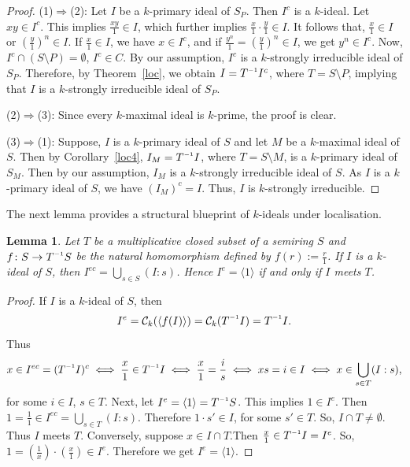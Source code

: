 \documentclass[11pt,english]{amsart}
\newcommand{\inv}{^{\raisebox{.2ex}{$\scriptscriptstyle-1$}}}
\newtheorem{lemma}[theorem]{Lemma}
\theoremstyle{definition}
\numberwithin{equation}{section}
\begin{document}
\begin{proof}
	(1)$\Rightarrow$(2):
Let $I$ be a $k$-primary ideal of $S_P$. Then $I^c$ is a $k$-ideal. Let $xy\in I^c$. This implies $\frac{xy}{1}\in I$, which further implies $\frac{x}{1}\cdot \frac{y}{1} \in I$. It follows that, $\frac{x}{1} \in I$ or $(\frac{y}{1})^n\in I$. If $\frac{x}{1} \in I$, we have $x \in I^c$, and if $\frac{y^n}{1}=(\frac{y}{1})^n \in I$, we get $y^n\in I^c$. Now, $I^c\cap (S\setminus P)=\emptyset$, $I^c\in C$. By our assumption, $I^c$ is a $k$-strongly irreducible ideal of $S_P$. Therefore, by Theorem~\ref{loc}, we obtain $I=T\inv I^c$, where $T=S\setminus P$, implying that $I$ is a $k$-strongly irreducible ideal of $S_P$.

    (2)$\Rightarrow$(3):
Since every $k$-maximal ideal is $k$-prime, the proof is clear.

    (3)$\Rightarrow$(1): 
Suppose, $I$ is a $k$-primary ideal of $S$ and let $M$ be a $k$-maximal ideal of $S$. Then by Corollary~\ref{loc4}, $I_M=T\inv I$, where $T=S\setminus M$, is a $k$-primary ideal of $S_M$. Then by our assumption, $I_M$ is a $k$-strongly irreducible ideal of $S$. As $I$ is a $k$-primary ideal of $S$, we have $(I_M)^c=I$. Thus, $I$ is  $k$-strongly irreducible.
\end{proof}
The next lemma provides a structural blueprint of $k$-ideals under localisation. 

\begin{lemma}\label{loc8}
    Let $T$ be a multiplicative closed subset of a semiring $S$ and $f\colon S\to T\inv S$ be the natural homomorphism defined by  $f(r):=\frac{r}{1}$. If $I$ is a $k$-ideal of $S$, then $I^{ec} = \bigcup\limits_{s\in S}$$(I:s)$. Hence $I^e=\langle1\rangle$ if and only if $I$ meets $T$.
\end{lemma}

\begin{proof}
    If $I$ is a $k$-ideal of $S$, then  \[I^e=\mathcal{C}_k(\langle f(I) \rangle)=\mathcal{C}_k(T\inv I)=T\inv I.\] Thus \[x\in I^{ec}=(T\inv I)^{c}\iff\frac{x}{1}\in T\inv I\iff\frac{x}{1}=\frac{i}{s}\iff xs=i\in I\iff x\in \bigcup_{s\in T}(I:s),\]  for some $i\in I$, $s\in T$.
Next, let  $I^{e}=\langle1 \rangle = T\inv S$. This implies $1\in I^{e}$. Then $1=\frac{1}{1} \in I^{ec} = \bigcup_{s\in T}$$(I:s)$. Therefore $1\cdot s'\in I$, for some $s'\in T$. So, $I\cap T\neq \emptyset$. Thus $I$ meets $T$. Conversely, suppose $x\in I\cap T$.Then $\frac{x}{1} \in T\inv I=I^{e}$. So, $1=(\frac{1}{x})\cdot(\frac{x}{1})\in I^{e}$. Therefore we get $I^{e}=\langle 1\rangle$.
\end{proof}
\end{document}
